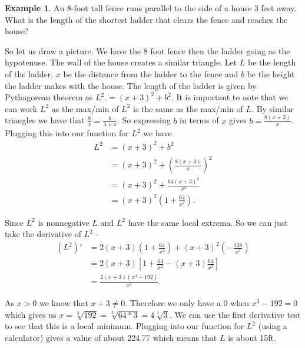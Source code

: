 \documentclass[12pt,reqno]{article}
\theoremstyle{definition}
\newtheorem*{Example}{Example}
\begin{document}
	\begin{Example}
		An 8-foot tall fence runs parallel to the side of a house 3 feet away. What is the length of the shortest ladder that clears the fence and reaches the house? 
		
		So let us draw a picture. We have the 8 foot fence then the ladder going as the hypotenuse. The wall of the house creates a similar triangle. Let $L$ be the length of the ladder, $x$ be the distance from the ladder to the fence and $b$ be the height the ladder makes with the house.  The length of the ladder is given by Pythagorean theorem as $L^2. = (x + 3)^2 + b^2$. It is important to note that we can work $L^2$ as the max/min of $L^2$ is the same as the max/min of $L$. By similar triangles we have that $\frac{8}{x} = \frac{b}{3 + x}$. So expressing $b$ in terms of $x$ gives $b = \frac{8 (x + 3)}{x}$. Plugging this into our function for $L^2$ we have 
		\begin{align*}
			L^2 &= (x + 3)^2 + b^2 \\
				&= (x + 3)^2 + \left(\frac{8 (x + 3)}{x}\right)^2 \\
				&= (x + 3)^2 + \frac{64 (x + 3)^2}{x^2} \\
				&= (x + 3)^2 \left(1 + \frac{64}{x^2}\right).
		\end{align*}
		
		Since $L^2$ is nonnegative $L$ and $L^2$ have the same local extrema. So we can just take the derivative of $L^2$ - 
		\begin{align*}
			(L^2)' &= 2(x + 3)\left(1 + \frac{64}{x^2}\right) + (x + 3)^2 \left(-\frac{128}{x^3}\right) \\
				   &=2(x + 3) \left[ 1 + \frac{64}{x^2} - (x + 3)\frac{64}{x^3}\right] \\
				   &= \frac{2(x + 3)(x^3 - 192)}{x^3}.
		\end{align*}
		
		As $x > 0$ we know that $x+ 3 \neq 0$. Therefore we only have a 0 when $x^3 - 192 = 0$ which gives us $x = \sqrt[3]{192} = \sqrt[3]{64*3} = 4 \sqrt[3]{3}$. We can use the first derivative test to see that this is a local minimum. Plugging into our function for $L^2$ (using a calculator) gives a value of about 224.77 which means that $L$ is about 15ft. 
	\end{Example}	
	
\end{document}
